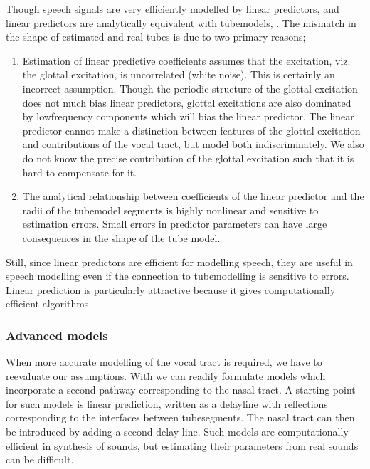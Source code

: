\documentclass[letterpaper,10pt,english]{jupyterBook}
\begin{document}
\sphinxAtStartPar
Though speech signals are very efficiently modelled by linear
predictors, and linear predictors are analytically equivalent with
tube\sphinxhyphen{}models, . The mismatch in the
shape of estimated and real tubes is due to two primary reasons;
\begin{enumerate}
%
\item {} 
\sphinxAtStartPar
Estimation of linear predictive coefficients assumes that the
excitation, viz. the glottal excitation, is uncorrelated (white
noise). This is certainly an incorrect assumption. Though the
periodic structure of the glottal excitation does not much bias
linear predictors, glottal excitations are also dominated by
low\sphinxhyphen{}frequency components which will bias the linear predictor. The
linear predictor cannot make a distinction between features of the
glottal excitation and contributions of the vocal tract, but model
both indiscriminately. We also do not know the precise contribution
of the glottal excitation such that it is hard to compensate for it.

\item {} 
\sphinxAtStartPar
The analytical relationship between coefficients of the linear
predictor and the radii of the tube\sphinxhyphen{}model segments is highly
non\sphinxhyphen{}linear and sensitive to estimation errors. Small errors in
predictor parameters can have large consequences in the shape of the
tube model.

\end{enumerate}

\sphinxAtStartPar
Still, since linear predictors are efficient for modelling speech, they
are useful in speech modelling even if the connection to tube\sphinxhyphen{}modelling
is sensitive to errors. Linear prediction is particularly attractive
because it gives computationally efficient algorithms.


\subsubsection{Advanced models}
\label{\detokenize{Introduction/Speech_production_and_acoustic_properties:advanced-models}}
\sphinxAtStartPar
When more accurate modelling of the vocal tract is required, we have to
re\sphinxhyphen{}evaluate our assumptions. With 
we can readily formulate models which incorporate a second pathway
corresponding to the nasal tract. A starting point for such models is
linear prediction, written as a delay\sphinxhyphen{}line with reflections
corresponding to the interfaces between tube\sphinxhyphen{}segments. The nasal tract
can then be introduced by adding a second delay line. Such models are
computationally efficient in synthesis of sounds, but estimating their
parameters from real sounds can be difficult.
\end{document}
